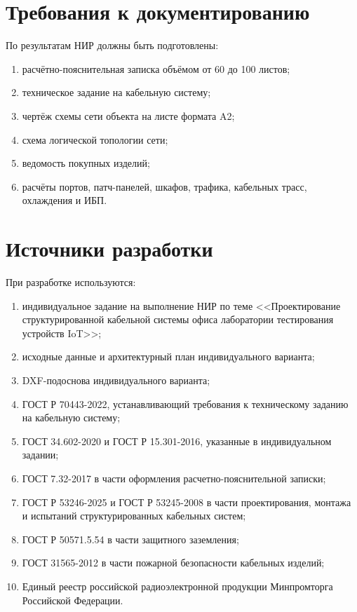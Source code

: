 \documentclass[a4paper,oneside,14pt]{extreport}
\begin{document}
\begin{appendices}

\section{Требования к документированию}

По результатам НИР должны быть подготовлены:

\begin{enumerate}[label=\asbuk*)]
    \item расчётно-пояснительная записка объёмом от 60 до 100 листов;
    \item техническое задание на кабельную систему;
    \item чертёж схемы сети объекта на листе формата A2;
    \item схема логической топологии сети;
    \item ведомость покупных изделий;
    \item расчёты портов, патч-панелей, шкафов, трафика, кабельных трасс, охлаждения и ИБП.
\end{enumerate}


\section{Источники разработки}

При разработке используются:

\begin{enumerate}[label=\asbuk*)]
    \item индивидуальное задание на выполнение НИР по теме <<Проектирование структурированной кабельной системы офиса лаборатории тестирования устройств IoT>>;
    \item исходные данные и архитектурный план индивидуального варианта;
    \item DXF-подоснова индивидуального варианта;
    \item ГОСТ Р 70443-2022, устанавливающий требования к техническому заданию на кабельную систему;
    \item ГОСТ 34.602-2020 и ГОСТ Р 15.301-2016, указанные в индивидуальном задании;
    \item ГОСТ 7.32-2017 в части оформления расчетно-пояснительной записки;
    \item ГОСТ Р 53246-2025 и ГОСТ Р 53245-2008 в части проектирования, монтажа и испытаний структурированных кабельных систем;
    \item ГОСТ Р 50571.5.54 в части защитного заземления;
    \item ГОСТ 31565-2012 в части пожарной безопасности кабельных изделий;
    \item Единый реестр российской радиоэлектронной продукции Минпромторга Российской Федерации.
\end{enumerate}


\end{appendices}
\end{document}

